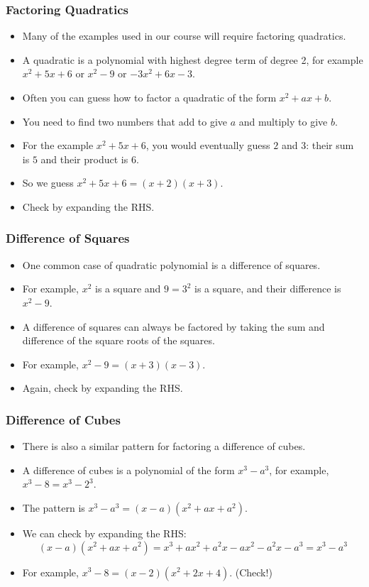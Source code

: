 \documentclass[serif,ignorenonframetext]{beamer}
\begin{document}
\begin{frame}
  \frametitle{Factoring Quadratics}
  \begin{itemize}[<+->]
  \item Many of the examples used in our course will require factoring
    quadratics.  
  \item A quadratic is a polynomial with highest degree term of degree
    2, for example $x^2+5x+6$ or $x^2-9$ or $-3x^2+6x-3$.
  \item Often you can guess how to factor a quadratic of the form
    $x^2+ax+b$.
  \item You need to find two numbers that add to give $a$ and multiply
    to give $b$.
  \item For the example $x^2+5x+6$, you would eventually guess $2$ and
    $3$: their sum is $5$ and their product is $6$.
  \item So we guess $x^2+5x+6=(x+2)(x+3)$.  
  \item Check by expanding the RHS.
  \end{itemize}
\end{frame}

\begin{frame}
  \frametitle{Difference of Squares}
  \begin{itemize}[<+->]
  \item One common case of quadratic polynomial is a difference of
    squares.
  \item For example, $x^2$ is a square and $9=3^2$ is a square, and
    their difference is $x^2-9$.
  \item A difference of squares can always be factored by taking the
    sum and difference of the square roots of the squares.
  \item For example, $x^2-9 = (x+3)(x-3)$.
  \item Again, check by expanding the RHS.
  \end{itemize}
\end{frame}

\begin{frame}
  \frametitle{Difference of Cubes}
  \begin{itemize}[<+->]
  \item There is also a similar pattern for factoring a difference of
    cubes.
  \item A difference of cubes is a polynomial of the form $x^3-a^3$,
    for example, $x^3-8=x^3-2^3$.
  \item The pattern is $x^3-a^3=(x-a)(x^2+ax+a^2)$.
  \item We can check by expanding the RHS: 
    \begin{equation*}
      (x-a)(x^2+ax+a^2) = x^3 + ax^2 + a^2x -ax^2 -a^2x - a^3 = x^3 - a^3
    \end{equation*}
  \item For example, $x^3-8=(x-2)(x^2+2x+4)$.  (Check!)
  \end{itemize}
\end{frame}
\end{document}
